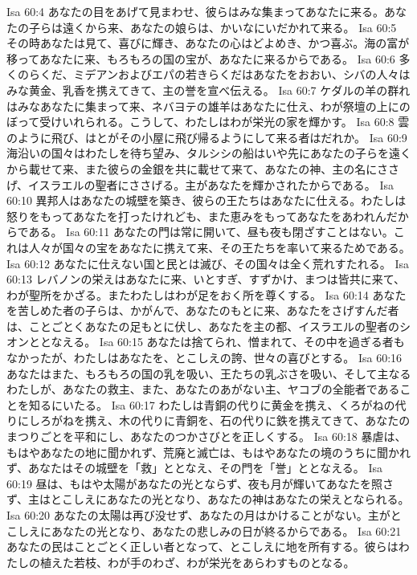 Isa 60:4  あなたの目をあげて見まわせ、彼らはみな集まってあなたに来る。あなたの子らは遠くから来、あなたの娘らは、かいなにいだかれて来る。
Isa 60:5  その時あなたは見て、喜びに輝き、あなたの心はどよめき、かつ喜ぶ。海の富が移ってあなたに来、もろもろの国の宝が、あなたに来るからである。
Isa 60:6  多くのらくだ、ミデアンおよびエパの若きらくだはあなたをおおい、シバの人々はみな黄金、乳香を携えてきて、主の誉を宣べ伝える。
Isa 60:7  ケダルの羊の群れはみなあなたに集まって来、ネバヨテの雄羊はあなたに仕え、わが祭壇の上にのぼって受けいれられる。こうして、わたしはわが栄光の家を輝かす。
Isa 60:8  雲のように飛び、はとがその小屋に飛び帰るようにして来る者はだれか。
Isa 60:9  海沿いの国々はわたしを待ち望み、タルシシの船はいや先にあなたの子らを遠くから載せて来、また彼らの金銀を共に載せて来て、あなたの神、主の名にささげ、イスラエルの聖者にささげる。主があなたを輝かされたからである。
Isa 60:10  異邦人はあなたの城壁を築き、彼らの王たちはあなたに仕える。わたしは怒りをもってあなたを打ったけれども、また恵みをもってあなたをあわれんだからである。
Isa 60:11  あなたの門は常に開いて、昼も夜も閉ざすことはない。これは人々が国々の宝をあなたに携えて来、その王たちを率いて来るためである。
Isa 60:12  あなたに仕えない国と民とは滅び、その国々は全く荒れすたれる。
Isa 60:13  レバノンの栄えはあなたに来、いとすぎ、すずかけ、まつは皆共に来て、わが聖所をかざる。またわたしはわが足をおく所を尊くする。
Isa 60:14  あなたを苦しめた者の子らは、かがんで、あなたのもとに来、あなたをさげすんだ者は、ことごとくあなたの足もとに伏し、あなたを主の都、イスラエルの聖者のシオンととなえる。
Isa 60:15  あなたは捨てられ、憎まれて、その中を過ぎる者もなかったが、わたしはあなたを、とこしえの誇、世々の喜びとする。
Isa 60:16  あなたはまた、もろもろの国の乳を吸い、王たちの乳ぶさを吸い、そして主なるわたしが、あなたの救主、また、あなたのあがない主、ヤコブの全能者であることを知るにいたる。
Isa 60:17  わたしは青銅の代りに黄金を携え、くろがねの代りにしろがねを携え、木の代りに青銅を、石の代りに鉄を携えてきて、あなたのまつりごとを平和にし、あなたのつかさびとを正しくする。
Isa 60:18  暴虐は、もはやあなたの地に聞かれず、荒廃と滅亡は、もはやあなたの境のうちに聞かれず、あなたはその城壁を「救」ととなえ、その門を「誉」ととなえる。
Isa 60:19  昼は、もはや太陽があなたの光とならず、夜も月が輝いてあなたを照さず、主はとこしえにあなたの光となり、あなたの神はあなたの栄えとなられる。
Isa 60:20  あなたの太陽は再び没せず、あなたの月はかけることがない。主がとこしえにあなたの光となり、あなたの悲しみの日が終るからである。
Isa 60:21  あなたの民はことごとく正しい者となって、とこしえに地を所有する。彼らはわたしの植えた若枝、わが手のわざ、わが栄光をあらわすものとなる。
